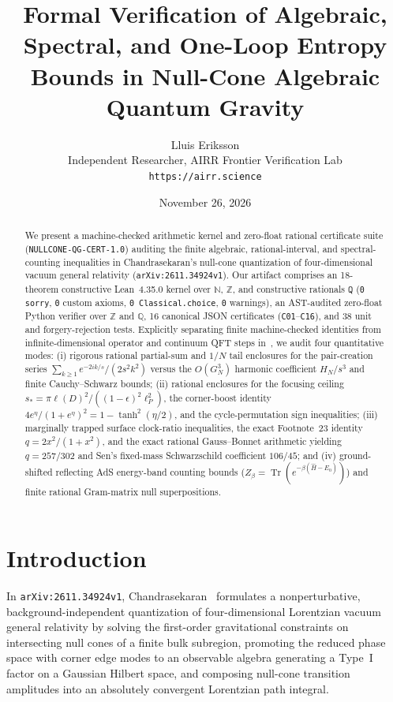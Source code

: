 \documentclass[10pt,twocolumn]{article}
\title{\textbf{Formal Verification of Algebraic, Spectral, and One-Loop Entropy Bounds in Null-Cone Algebraic Quantum Gravity}}
\author{Lluis Eriksson\\
\small Independent Researcher, AIRR Frontier Verification Lab\\
\small \texttt{https://airr.science}}
\date{November 26, 2026}
\begin{document}
\maketitle

\begin{abstract}
We present a machine-checked arithmetic kernel and zero-float rational certificate suite (\texttt{NULLCONE-QG-CERT-1.0}) auditing the finite algebraic, rational-interval, and spectral-counting inequalities in Chandrasekaran's null-cone quantization of four-dimensional vacuum general relativity (\texttt{arXiv:2611.34924v1}). Our artifact comprises an 18-theorem constructive Lean~4.35.0 kernel over $\mathbb{N}$, $\mathbb{Z}$, and constructive rationals $\texttt{Q}$ (\texttt{0 sorry}, \texttt{0} custom axioms, \texttt{0 Classical.choice}, \texttt{0} warnings), an AST-audited zero-float Python verifier over $\mathbb{Z}$ and $\mathbb{Q}$, 16 canonical JSON certificates (\texttt{C01}--\texttt{C16}), and 38 unit and forgery-rejection tests. Explicitly separating finite machine-checked identities from infinite-dimensional operator and continuum QFT steps in~\cite{Chandrasekaran2026}, we audit four quantitative modes: (i) rigorous rational partial-sum and $1/N$ tail enclosures for the pair-creation series $\sum_{k\geq 1} e^{-2ik/s}/(2s^2 k^2)$ versus the $O(G_N^3)$ harmonic coefficient $H_N/s^3$ and finite Cauchy--Schwarz bounds; (ii) rational enclosures for the focusing ceiling $s_* = \pi \ell(D)^2/((1-\epsilon)^2 \ell_P^2)$, the corner-boost identity $4e^\eta/(1+e^\eta)^2 = 1-\tanh^2(\eta/2)$, and the cycle-permutation sign inequalities; (iii) marginally trapped surface clock-ratio inequalities, the exact Footnote~23 identity $q = 2x^2/(1+x^2)$, and the exact rational Gauss--Bonnet arithmetic yielding $q = 257/302$ and Sen's fixed-mass Schwarzschild coefficient $106/45$; and (iv) ground-shifted reflecting AdS energy-band counting bounds ($Z_\beta = \operatorname{Tr}(e^{-\beta(\hat{H}-E_0)})$) and finite rational Gram-matrix null superpositions.
\end{abstract}

\section{Introduction}
In \texttt{arXiv:2611.34924v1}, Chandrasekaran~\cite{Chandrasekaran2026} formulates a nonperturbative, background-independent quantization of four-dimensional Lorentzian vacuum general relativity by solving the first-order gravitational constraints on intersecting null cones of a finite bulk subregion, promoting the reduced phase space with corner edge modes to an observable algebra generating a Type~I factor on a Gaussian Hilbert space, and composing null-cone transition amplitudes into an absolutely convergent Lorentzian path integral.
\end{document}
